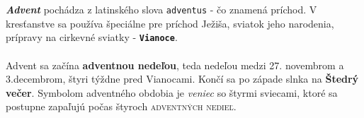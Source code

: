 \documentclass{article}
\begin{document}
\noindent \color{red}\large {\textit{\textbf {\huge A\large dvent}}} \color{black}\normalsize pochádza z latinského slova \color{green}\texttt{adventus}\color{black} - čo znamená príchod. V \sffamily kresťanstve \rmfamily sa používa špeciálne pre príchod \color{orange}\large{Ježiša}\color{black}, \normalsize sviatok jeho narodenia, prípravy na cirkevné sviatky - \color{blue} \textbf{ \texttt{\huge Vianoce}}\color{black}.\\\\\sffamily Advent sa začína \color{brown}\textbf{adventnou nedeľou}\color{black}, teda nedeľou medzi 27. novembrom a 3.decembrom, štyri týždne pred Vianocami. Končí sa po západe slnka na \color{purple}\textrm{\textbf{Štedrý večer}}\color{black}. Symbolom adventného obdobia je \color{gray}\textit{veniec} \color{black}so štyrmi sviecami, ktoré sa postupne zapaľujú počas štyroch \textsc{adventných nedieľ}.
\end{document}
